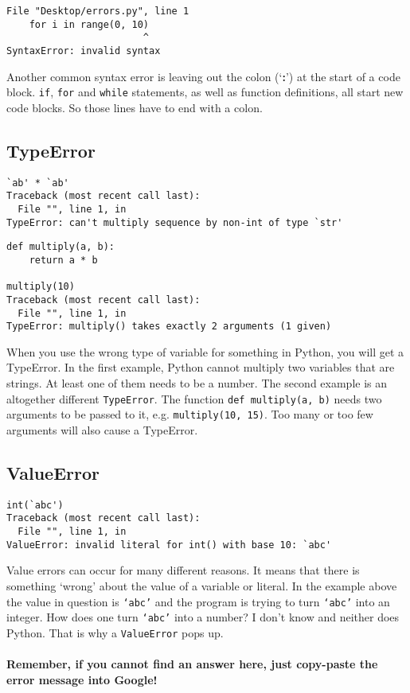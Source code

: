 \begin{lstlisting}
File "Desktop/errors.py", line 1
    for i in range(0, 10)
                        ^
SyntaxError: invalid syntax\end{lstlisting}

Another common syntax error is leaving out the colon (`\textbf{:}') at the start of a code block. \texttt{if}, \texttt{for} and \texttt{while} statements, as well as function                 definitions, all start new code blocks. So those lines have to end with a colon.

\subsection{TypeError}

\begin{lstlisting}
`ab' * `ab'
Traceback (most recent call last):
  File "", line 1, in 
TypeError: can't multiply sequence by non-int of type `str'
\end{lstlisting}
\begin{lstlisting}
def multiply(a, b):
    return a * b

multiply(10)
Traceback (most recent call last):
  File "", line 1, in 
TypeError: multiply() takes exactly 2 arguments (1 given)\end{lstlisting}

When you use the wrong type of variable for something in Python, you will get a TypeError. In the first example, Python                 cannot multiply two variables that are strings. At least one of them needs to be a number. The second example is an altogether                 different \texttt{TypeError}. The function 
\texttt{def multiply(a, b)} needs two arguments to be passed to it, e.g. 
\texttt{multiply(10, 15)}.                 Too many or too few arguments will also cause a TypeError.

\subsection{ValueError}

\begin{lstlisting}
int(`abc')
Traceback (most recent call last):
  File "", line 1, in 
ValueError: invalid literal for int() with base 10: `abc'\end{lstlisting}

Value errors can occur for many different reasons. It means that there is something `wrong' about the value of a variable or                  literal. In the example above the value in question is \texttt{`abc'} and the program is trying to turn \texttt{`abc'} into an integer. How does one                 turn \texttt{`abc'} into a number? I don't know and neither does Python. That is why a \texttt{ValueError} pops up.
\\ \\
\textbf{Remember, if you cannot find an answer here, just copy-paste the error message into Google!} 
